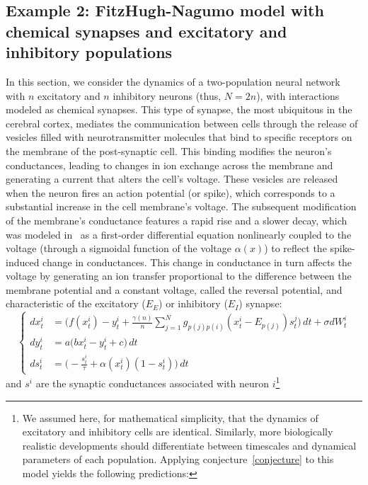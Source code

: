 \documentclass[onefignum,onetabnum]{siamart190516}
\newcommand{\1}{\mathbbm{1}}
\newcommand{\review}[1]{\textcolor{midblue}{ #1}}
\renewcommand{\review}[1]{{ #1}}
\begin{document}
\subsection{Example 2: FitzHugh-Nagumo model with chemical synapses and excitatory and inhibitory populations}\label{sec:Chemical}
\review{In this section, we consider the dynamics of a two-population neural network with $n$ excitatory and $n$ inhibitory neurons (thus, $N=2n$), with interactions modeled as chemical synapses. This type of synapse, the most ubiquitous in the cerebral cortex, mediates the communication between cells through the release of vesicles filled with neurotransmitter molecules that bind to specific receptors on the membrane of the post-synaptic cell. This binding modifies the neuron's conductances, leading to changes in ion exchange across the membrane and generating a current that alters the cell's voltage. These vesicles are released when the neuron fires an action potential (or spike), which corresponds to a substantial increase in the cell membrane's voltage. The subsequent modification of the membrane's conductance features a rapid rise and a slower decay, which was modeled in~\cite{destexhe1998kinetic} as a first-order differential equation nonlinearly coupled to the voltage (through a sigmoidal function of the voltage $\alpha(x)$) to reflect the spike-induced change in conductances. This change in conductance in turn affects the voltage by generating an ion transfer proportional to the difference between the membrane potential and a constant voltage, called the reversal potential, and characteristic of the excitatory ($E_E$) or inhibitory ($E_I$) synapse:}
		\begin{equation}\label{eq:EIFhN}
		\begin{cases}
			dx^i_t&=\displaystyle{\Big(f(x^i_t)-y^i_t+\frac{\gamma(n)}{n}\sum_{j=1}^{N}g_{p(j)p(i)} (x^i_t-E_{p(j)}) s^{j}_t\Big)\,dt +\sigma dW^i_t}\\
			dy^i_t&=a\Big(bx^i_t-y^i_t+c\Big)\,dt\\
			ds^{i}_t&=\Big(-\frac{s^{i}_t}{\tau}+\alpha(x^i_t)(1-s^{i}_t)\Big)\,dt
		\end{cases}
	\end{equation}
\review{and $s^i$ are the synaptic conductances associated with neuron $i$\footnote{We assumed here, for mathematical simplicity, that the dynamics of excitatory and inhibitory cells are identical. Similarly, more biologically realistic developments should differentiate between timescales and dynamical parameters of each population. Applying conjecture~\ref{conjecture} to this model yields the following predictions:}}
\end{document}
